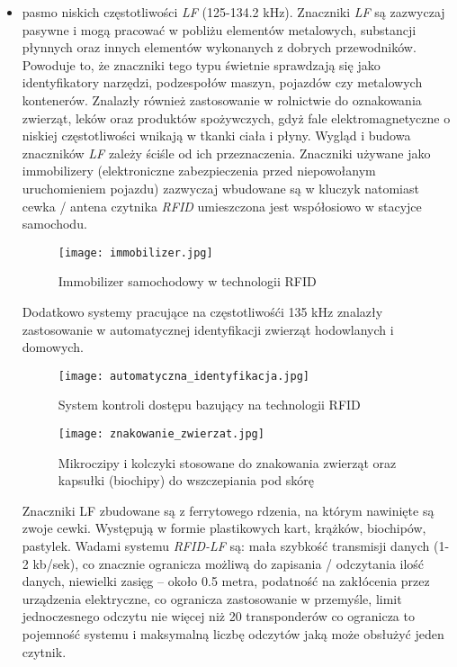 \begin{itemize}\setlength{\itemsep}{0pt}
	\item pasmo niskich częstotliwości \emph {LF} (125-134.2 kHz).
Znaczniki \emph{LF} są zazwyczaj pasywne i mogą pracować w pobliżu elementów metalowych, substancji płynnych oraz innych elementów wykonanych z dobrych przewodników. Powoduje to, że znaczniki tego typu świetnie sprawdzają się jako identyfikatory narzędzi, podzespołów maszyn, pojazdów czy metalowych kontenerów. Znalazły również zastosowanie w rolnictwie do oznakowania zwierząt, leków oraz produktów spożywczych, gdyż fale elektromagnetyczne o niskiej częstotliwości wnikają w tkanki ciała i płyny.
Wygląd i budowa znaczników \emph{LF} zależy ściśle od ich przeznaczenia. Znaczniki używane jako immobilizery (elektroniczne zabezpieczenia przed niepowołanym uruchomieniem pojazdu) zazwyczaj wbudowane są w kluczyk natomiast cewka /  antena czytnika \emph{RFID} umieszczona jest współosiowo w stacyjce samochodu.
   
	\begin{figure}[h!]
	\centering
	    \texttt{[image: immobilizer.jpg]}
	    \caption{Immobilizer samochodowy w technologii RFID}
	\end{figure}

	Dodatkowo systemy pracujące na częstotliwośći 135 kHz znalazły zastosowanie w automatycznej identyfikacji zwierząt hodowlanych i domowych.

	\begin{figure}[h!]
	\centering
	    \texttt{[image: automatyczna\_identyfikacja.jpg]}
	    \caption{System kontroli dostępu bazujący na technologii RFID}
	\end{figure}
	
	\begin{figure}[h!]
	\centering
	    \texttt{[image: znakowanie\_zwierzat.jpg]}
	    \caption{Mikroczipy i kolczyki stosowane do znakowania zwierząt oraz kapsułki (biochipy) do wszczepiania pod skórę}
	\end{figure}
	
	Znaczniki LF zbudowane są z ferrytowego rdzenia, na którym nawinięte są zwoje cewki. Występują w formie plastikowych kart, krążków, biochipów, pastylek. Wadami systemu \emph{RFID-LF} są: mała szybkość transmisji danych (1-2 kb/sek), co znacznie ogranicza możliwą do zapisania / odczytania ilość danych, niewielki zasięg – około 0.5 metra, podatność na zakłócenia przez urządzenia elektryczne, co ogranicza zastosowanie w przemyśle, limit jednoczesnego odczytu nie więcej niż 20 transponderów co ogranicza to pojemność systemu i maksymalną liczbę odczytów jaką może obsłużyć jeden czytnik. 


\end{itemize}
